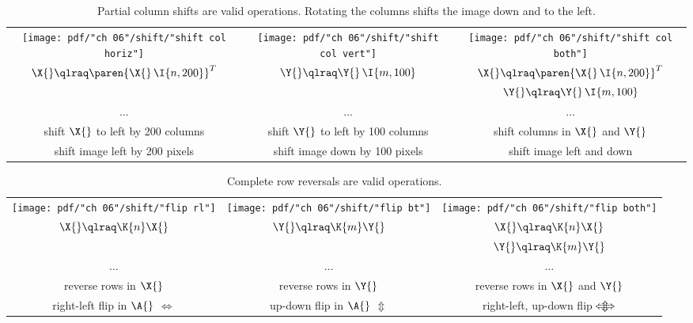 \begin{landscape}
\thispagestyle{empty}
\begin{table}[htdp]
\begin{center}
\begin{tabular}{ccc}
\texttt{[image: pdf/"ch 06"/shift/"shift col horiz"]} &
\texttt{[image: pdf/"ch 06"/shift/"shift col vert"]} &
\texttt{[image: pdf/"ch 06"/shift/"shift col both"]} \\
$\X{} \qlraq \paren{ \X{}\,\I{n,200}}^{T}$ &
$\Y{} \qlraq \Y{}\,\I{m,100}$ &
$\X{} \qlraq \paren{ \X{}\,\I{n,200}}^{T}$ \\ &&
$\Y{} \qlraq \Y{}\,\I{m,100}$ \\
$\dots$ &
$\dots$ &
$\dots$ \\
shift $\X{}$ to left by 200 columns &
shift $\Y{}$ to left by 100 columns &
shift columns in $\X{}$ and $\Y{}$\\[5pt]
shift image left by 200 pixels &
shift image down by 100 pixels &
shift image left and down\\[5pt]
\end{tabular}
\end{center}
\label{tab:Jordan:shift}
\caption[Partial column shifts are valid operations]{Partial column shifts are valid operations. Rotating the columns shifts the image down and to the left.}
\end{table}%
\end{landscape}


\clearpage
\break

\begin{landscape}
\thispagestyle{empty}
\begin{table}[htdp]
\begin{center}
\begin{tabular}{ccc}
\texttt{[image: pdf/"ch 06"/shift/"flip rl"]} &
\texttt{[image: pdf/"ch 06"/shift/"flip bt"]} &
\texttt{[image: pdf/"ch 06"/shift/"flip both"]} \\
$\X{} \qlraq \K{n}\X{}$ &
$\Y{} \qlraq \K{m}\Y{}$ &
$\X{} \qlraq \K{n}\X{}$ \\ &&
$\Y{} \qlraq \K{m}\Y{}$ \\
$\dots$ &
$\dots$ &
$\dots$ \\
reverse rows in $\X{}$ &
reverse rows in $\Y{}$ &
reverse rows in $\X{}$ and $\Y{}$\\[5pt]
right-left flip in $\A{}$ $\Longleftrightarrow$ &
up-down flip in $\A{}$ $\Updownarrow$ &
right-left, up-down flip \ $\Updownarrow \negthickspace \negthickspace  \negmedspace  \negmedspace \negmedspace  \Longleftrightarrow$\\[5pt]
\end{tabular}
\end{center}
\label{tab:Jordan:reverse}
\caption{Complete row reversals are valid operations.}
\end{table}%
\end{landscape}

